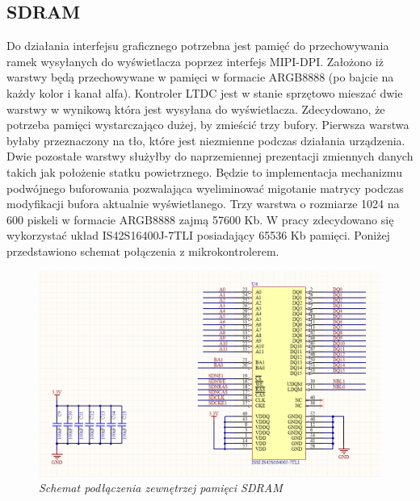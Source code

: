 \documentclass[eng,printmode]{mgr}
\begin{document}
\subsection*{SDRAM}
Do działania interfejsu graficznego potrzebna jest pamięć do przechowywania ramek wysyłanych do wyświetlacza poprzez interfejs MIPI-DPI. Założono iż warstwy będą przechowywane w pamięci w formacie ARGB8888 (po bajcie na każdy kolor i kanał alfa). Kontroler LTDC jest w stanie sprzętowo mieszać dwie warstwy w wynikową która jest wysyłana do wyświetlacza. Zdecydowano, że potrzeba pamięci wystarczająco dużej, by zmieścić trzy bufory. Pierwsza warstwa byłaby przeznaczony na tło, które jest niezmienne podczas działania urządzenia. Dwie pozostałe warstwy służyłby do naprzemiennej prezentacji zmiennych danych takich jak położenie statku powietrznego. Będzie to implementacja mechanizmu podwójnego buforowania pozwalająca wyeliminować migotanie matrycy podczas modyfikacji bufora aktualnie wyświetlanego. Trzy warstwa o rozmiarze 1024 na 600 piskeli w formacie ARGB8888 zajmą 57600 Kb. W pracy zdecydowano się wykorzystać układ IS42S16400J-7TLI posiadający 65536 Kb pamięci. Poniżej przedstawiono schemat połączenia z mikrokontrolerem.

\begin{figure}[!h]
    \centering
    \includegraphics[width=\textwidth]{schematics/sdram.png}
    \caption{\textit{\scriptsize Schemat podłączenia zewnętrzej pamięci SDRAM}}
\end{figure}
\end{document}
